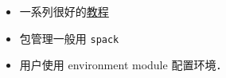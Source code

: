 
\begin{issues}
\issueDraft
\end{issues}

\begin{itemize}
\item 一系列很好的\href{https://hpc-tutorials.llnl.gov/}{教程}
\item 包管理一般用 \verb|spack|
\item 用户使用 environment module 配置环境．
\end{itemize}
